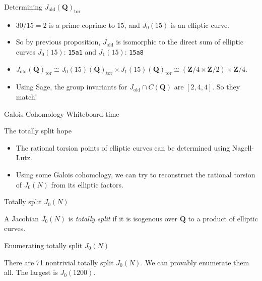 \documentclass{beamer}
\newcommand{\QQ}{\mathbf{Q}}
\newcommand{\ZZ}{\mathbf{Z}}
\renewcommand{\ZZ}{\mathbf{Z}}
\newcommand{\tor}{\mathrm{tor}}
\newcommand{\old}{\mathrm{old}}
\begin{document}
\begin{frame}{Determining $J_\old(\QQ)_\tor$}
    \begin{itemize}
        \item
            $30/15=2$ is a prime coprime to $15$, and $J_0(15)$ is an
            elliptic curve.
        \item
            So by previous proposition, $J_\old$ is
            isomorphic to the direct sum of elliptic curves $J_0(15)$:
            \texttt{15a1} and $J_1(15)$: \texttt{15a8}
        \item
            $J_\old(\QQ)_\tor\cong J_0(15)(\QQ)_\tor \times J_1(15)(\QQ)_\tor
            \cong (\ZZ/4\times \ZZ/2)\times \ZZ/4$.
        \item
            Using Sage, the group invariants for $J_\old \cap C(\QQ)$ are
            $[2,4,4]$. So they match!
    \end{itemize}
\end{frame}

\begin{frame}[standout]{Galois Cohomology}
    \Huge{Whiteboard time}
\end{frame}

\begin{frame}{The totally split hope}
    \begin{itemize}
        \item
            The rational torsion points of elliptic curves can be determined
            using Nagell-Lutz.
        \item
            Using some Galois cohomology, we can try to reconstruct the
            rational torsion of $J_0(N)$ from its elliptic factors.
    \end{itemize}
\end{frame}

\begin{frame}{Totally split $J_0(N)$}
    \begin{definition}
        A Jacobian $J_0(N)$ is \emph{totally split} if it is isogenous over
        $\QQ$ to a product of elliptic curves.
    \end{definition}
\end{frame}

\begin{frame}{Enumerating totally split $J_0(N)$}
    \begin{theorem}[L.]
        There are 71 nontrivial totally split $J_0(N)$. We can provably
        enumerate them all. The largest is $J_0(1200)$.
    \end{theorem}
\end{frame}
\end{document}
